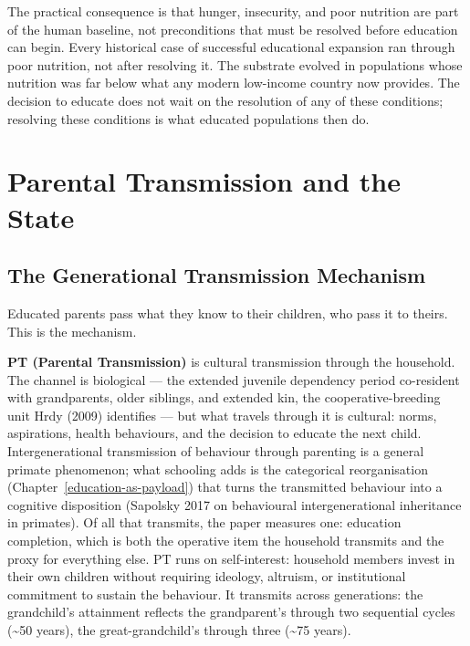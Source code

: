 \documentclass[12pt,letterpaper]{article}
\begin{document}
The practical consequence is that hunger, insecurity, and poor
nutrition are part of the human baseline, not preconditions that
must be resolved before education can begin. Every historical case of
successful educational expansion ran through poor nutrition, not
after resolving it. The substrate evolved in populations whose
nutrition was far below what any modern low-income country now
provides. The decision to educate does not wait on the resolution of
any of these conditions; resolving these conditions is what educated
populations then do.

\section{Parental Transmission and the State}\label{pt-and-state}

\subsection{The Generational Transmission Mechanism}\label{the-generational-transmission-mechanism}

Educated parents pass what they know to their children, who pass it to theirs. This is the mechanism.

\textbf{PT (Parental Transmission)} is cultural transmission through
the household. The channel is biological --- the extended juvenile
dependency period co-resident with grandparents, older siblings, and
extended kin, the cooperative-breeding unit Hrdy (2009) identifies ---
but what travels through it is cultural: norms, aspirations, health
behaviours, and the decision to educate the next child.
Intergenerational transmission of behaviour through parenting is a
general primate phenomenon; what schooling adds is the categorical
reorganisation (Chapter~\ref{education-as-payload}) that turns the
transmitted behaviour into a cognitive disposition (Sapolsky 2017 on
behavioural intergenerational inheritance in primates). Of all that
transmits, the paper measures one: education completion, which is
both the operative item the household transmits and the proxy for
everything else.
PT runs on self-interest: household members invest in their own
children without requiring ideology, altruism, or institutional
commitment to sustain the behaviour. It transmits across generations:
the grandchild's attainment reflects the grandparent's through two
sequential cycles (\textasciitilde50 years), the great-grandchild's
through three (\textasciitilde75 years).
\end{document}
